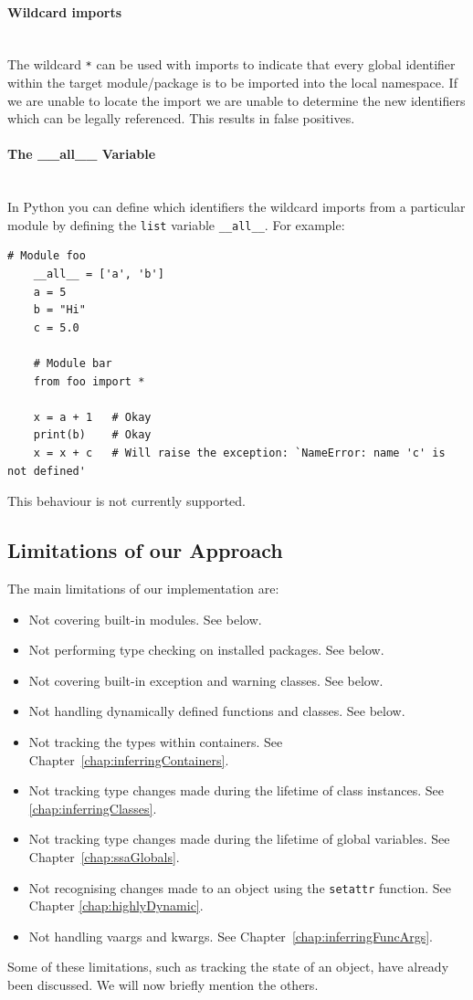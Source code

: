 \documentclass[12pt, titlepage]{article}
\begin{document}
\paragraph*{Wildcard imports}\mbox{} \\
The wildcard \texttt{*} can be used with imports to indicate that every global identifier within the target module/package is to be imported into the local namespace. If we are unable to locate the import we are unable to determine the new identifiers which can be legally referenced. This results in false positives.

\paragraph*{The \_\_all\_\_ Variable}\mbox{} \\
In Python you can define which identifiers the wildcard imports from a particular module by defining the \texttt{list} variable \texttt{\_\_all\_\_}. For example:
\begin{lstlisting}[mathescape]
    # Module foo 
    __all__ = ['a', 'b']
    a = 5
    b = "Hi"
    c = 5.0
    
    # Module bar
    from foo import *
    
    x = a + 1   # Okay
    print(b)    # Okay
    x = x + c   # Will raise the exception: `NameError: name 'c' is not defined'
\end{lstlisting}
This behaviour is not currently supported.


\subsection{Limitations of our Approach}
\label{chap:limitations}
The main limitations of our implementation are:
\begin{itemize}
	\item Not covering built-in modules. See below.
	\item Not performing type checking on installed packages. See below.
	\item Not covering built-in exception and warning classes. See below.
	\item Not handling dynamically defined functions and classes. See below.
	\item Not tracking the types within containers. See Chapter~\ref{chap:inferringContainers}.
	\item Not tracking type changes made during the lifetime of class instances. See \ref{chap:inferringClasses}.
	\item Not tracking type changes made during the lifetime of global variables. See Chapter~\ref{chap:ssaGlobals}.
	\item Not recognising changes made to an object using the \texttt{setattr} function. See Chapter \ref{chap:highlyDynamic}.
	\item Not handling vaargs and kwargs. See Chapter~\ref{chap:inferringFuncArgs}.
\end{itemize}
Some of these limitations, such as tracking the state of an object, have already been discussed. We will now briefly mention the others.
\end{document}
